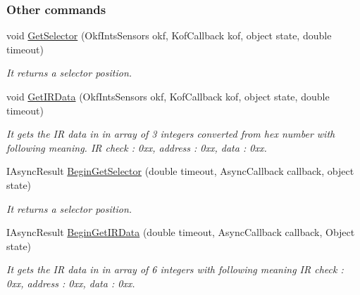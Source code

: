 \subsubsection*{Other commands} %
\label{ssub:Extra}
  \begin{DoxyCompactItemize}

  \item  void \hyperlink{class_elib_1_1_epuck_a40c8bc92b67a20c3fdf891997eaf03c5}{GetSelector} (OkfIntsSensors okf, KofCallback kof, object state, double timeout)
  \begin{DoxyCompactList}\small\item\em It returns a selector position. \item\end{DoxyCompactList}

  \item   void \hyperlink{class_elib_1_1_epuck_ad74c7a6d5618da33d84aee5666d990c5}{GetIRData} (OkfIntsSensors okf, KofCallback kof, object state, double timeout)
  \begin{DoxyCompactList}\small\item\em It gets the IR data in in array of 3 integers converted from hex number with following meaning. IR check : 0xx, address : 0xx, data : 0xx. \item\end{DoxyCompactList}

  \item   IAsyncResult \hyperlink{class_elib_1_1_epuck_a23a675feab78848b194cb49a01a30463}{BeginGetSelector} (double timeout, AsyncCallback callback, object state)
  \begin{DoxyCompactList}\small\item\em It returns a selector position. \item\end{DoxyCompactList}

  \item IAsyncResult \hyperlink{class_elib_1_1_epuck_a58eb06f216af8ff7a7203f0f91b010e7}{BeginGetIRData} (double timeout, AsyncCallback callback, Object state)
  \begin{DoxyCompactList}\small\item\em It gets the IR data in in array of 6 integers with following meaning IR check : 0xx, address : 0xx, data : 0xx. \item\end{DoxyCompactList}

  \end{DoxyCompactItemize}

